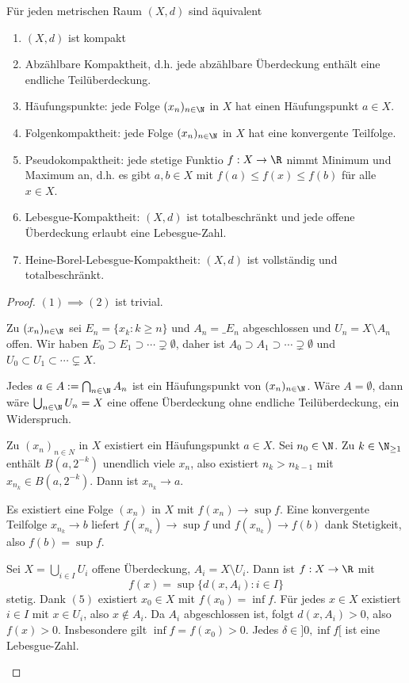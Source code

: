 \begin{st}
	Für jeden metrischen Raum $(X,d)$ sind äquivalent
	\begin{enumerate}[(1)]
		\item
			$(X,d)$ ist kompakt
		\item
			Abzählbare Kompaktheit, d.h. jede abzählbare Überdeckung enthält eine endliche Teilüberdeckung.
		\item
			Häufungspunkte: jede Folge $(x_n)_{n\in \N}$ in $X$ hat einen Häufungspunkt $a \in X$.
		\item
			Folgenkompaktheit: jede Folge $(x_n)_{n\in \N}$ in $X$ hat eine konvergente Teilfolge.
		\item
			Pseudokompaktheit: jede stetige Funktio $f: X \to \R$ nimmt Minimum und Maximum an, d.h. es gibt $a,b \in X$ mit $f(a) \le f(x) \le f(b)$ für alle $x \in X$.
		\item
			Lebesgue-Kompaktheit: $(X,d)$ ist totalbeschränkt und jede offene Überdeckung erlaubt eine Lebesgue-Zahl.
		\item
			Heine-Borel-Lebesgue-Kompaktheit: $(X,d)$ ist vollständig und totalbeschränkt.
	\end{enumerate}
	\begin{proof}
		$(1) \implies (2)$ ist trivial.
		\begin{seg}[$(2) \implies (3)$]
			Zu $(x_n)_{n\in\N}$ sei $E_n = \{x_k : k \ge n\}$ und $A_n = \_{E_n}$ abgeschlossen und $U_n = X \setminus A_n$ offen.
			Wir haben $E_0 \supset E_1 \supset \dotsb \supsetneq \emptyset$, daher ist $A_0 \supset A_1 \supset \dotsb \supsetneq \emptyset$ und $U_0 \subset U_1 \subset \dotsb \subsetneq X$.

			Jedes $a \in A := \bigcap_{n\in \N} A_n$ ist ein Häufungspunkt von $(x_n)_{n\in\N}$.
			Wäre $A = \emptyset$, dann wäre $\bigcup_{n \in \N} U_n = X$ eine offene Überdeckung ohne endliche Teilüberdeckung, ein Widerspruch.
		\end{seg}
		\begin{seg}[$(3) \implies (4)$]
			Zu $(x_n)_{n\in N}$ in $X$ existiert ein Häufungspunkt $a \in X$.
			Sei $n_0 \in \N$.
			Zu $k \in \N_{\ge 1}$ enthält $B(a, 2^{-k})$ unendlich viele $x_n$, also existiert $n_k > n_{k-1}$ mit $x_{n_k} \in B(a,2^{-k})$.
			Dann ist $x_{n_k} \to a$.
		\end{seg}
		\begin{seg}[$(4) \implies (5)$]
			Es existiert eine Folge $(x_n)$ in $X$ mit $f(x_n) \to \sup f$.
			Eine konvergente Teilfolge $x_{n_k} \to b$ liefert $f(x_{n_k}) \to \sup f$ und $f(x_{n_k}) \to f(b)$ dank Stetigkeit, also $f(b) = \sup f$.
		\end{seg}
		\begin{seg}[$(5) \implies (6)$]
			Sei $X = \bigcup_{i \in I} U_i$ offene Überdeckung, $A_i = X \setminus U_i$.
			Dann ist $f: X \to \R$ mit
			\[
				f(x) = \sup \{ d(x, A_i) : i \in I \}
			\]
			stetig.
			Dank $(5)$ existiert $x_0 \in X$ mit $f(x_0) = \inf f$.
			Für jedes $x \in X$ existiert $i \in I$ mit $x \in U_i$, also $x \not\in A_i$.
			Da $A_i$ abgeschlossen ist, folgt $d(x,A_i) > 0$, also $f(x) > 0$.
			Insbesondere gilt $\inf f = f(x_0) > 0$.
			Jedes $\delta \in ]0, \inf f[$ ist eine Lebesgue-Zahl.


\end{seg}
\end{proof}
\end{st}
